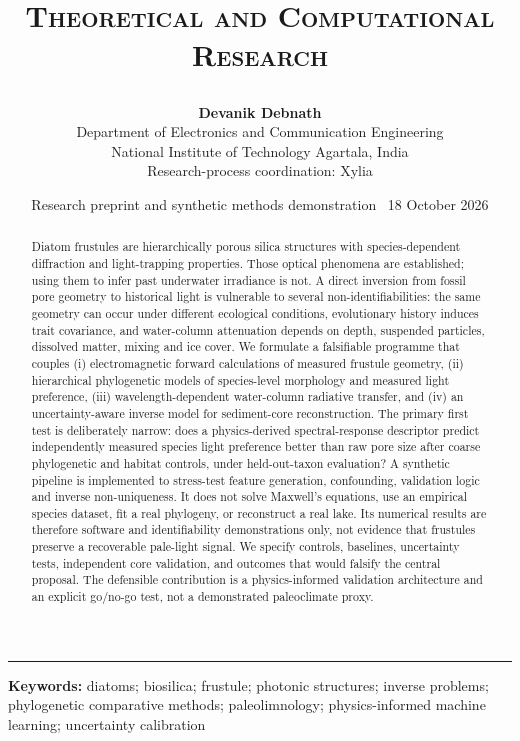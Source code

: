 \documentclass[11pt,a4paper]{article}
\title{\vspace{-1.1cm}\begin{flushleft}\large\color{teal}\textsc{Theoretical and Computational Research}\end{flushleft}\vspace{0.35em}{\LARGE\bfseries\color{ink} Silica Light Meters:\\[0.2em] Physics-Constrained Inverse Learning of Past Underwater Light Regimes from Diatom Frustule Photonic Crystals}}
\author{\textbf{Devanik Debnath}\\[-0.1em]\small Department of Electronics and Communication Engineering\\\small National Institute of Technology Agartala, India\\[0.2em]\small Research-process coordination: Xylia}
\date{\small Research preprint and synthetic methods demonstration \textbar\ 18 October 2026}
\begin{document}
\maketitle
\vspace{-0.4em}
\begin{center}\color{teal}\rule{0.92\linewidth}{1.0pt}\end{center}
\begin{abstract}
Diatom frustules are hierarchically porous silica structures with species-dependent diffraction and light-trapping properties. Those optical phenomena are established; using them to infer past underwater irradiance is not. A direct inversion from fossil pore geometry to historical light is vulnerable to several non-identifiabilities: the same geometry can occur under different ecological conditions, evolutionary history induces trait covariance, and water-column attenuation depends on depth, suspended particles, dissolved matter, mixing and ice cover. We formulate a falsifiable programme that couples (i) electromagnetic forward calculations of measured frustule geometry, (ii) hierarchical phylogenetic models of species-level morphology and measured light preference, (iii) wavelength-dependent water-column radiative transfer, and (iv) an uncertainty-aware inverse model for sediment-core reconstruction. The primary first test is deliberately narrow: does a physics-derived spectral-response descriptor predict independently measured species light preference better than raw pore size after coarse phylogenetic and habitat controls, under held-out-taxon evaluation? A synthetic pipeline is implemented to stress-test feature generation, confounding, validation logic and inverse non-uniqueness. It does not solve Maxwell's equations, use an empirical species dataset, fit a real phylogeny, or reconstruct a real lake. Its numerical results are therefore software and identifiability demonstrations only, not evidence that frustules preserve a recoverable pale-light signal. We specify controls, baselines, uncertainty tests, independent core validation, and outcomes that would falsify the central proposal. The defensible contribution is a physics-informed validation architecture and an explicit go/no-go test, not a demonstrated paleoclimate proxy.
\end{abstract}
\vspace{-0.3em}
\textbf{Keywords:} diatoms; biosilica; frustule; photonic structures; inverse problems; phylogenetic comparative methods; paleolimnology; physics-informed machine learning; uncertainty calibration
\end{document}
